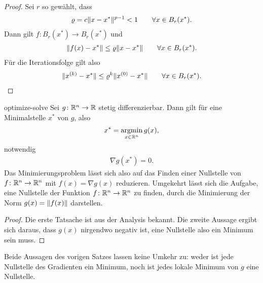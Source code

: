 \begin{proof}
  Sei $r$ so gewählt, dass
  \begin{gather}
    \varrho = c \lVert x-x^*\rVert^{p-1} < 1 \qquad\forall x\in B_r(x^*).
  \end{gather}
  Dann gilt $f\colon  B_r(x^*) \to  B_r(x^*)$ und
  \begin{gather}
    \lVert f(x)-x^*\rVert \le \varrho \lVert x-x^*\rVert \qquad\forall x\in B_r(x^*).
  \end{gather}
  Für die Iterationsfolge gilt also
  \begin{gather}
    \lVert x^{(k)}-x^*\rVert
    \le \varrho^k \lVert x^{(0)}-x^*\rVert
    \qquad\forall x\in B_r(x^*).
  \end{gather} 
\end{proof}

\begin{Satz}{optimize-solve}
  Sei $g\colon \mathbb R^n\to \mathbb R$ stetig differenzierbar. Dann gilt für eine
  Minimalstelle $x^*$ von $g$, also
  \begin{gather}
    x^* = \operatorname*{argmin}_{x\in\mathbb R^n} g(x),
  \end{gather}
  notwendig
  \begin{gather}
    \nabla g(x^*) = 0.
  \end{gather}
  Das Minimierungsproblem lässt sich also auf das Finden einer
  Nullstelle von $f\colon \mathbb R^n\to \mathbb R^n$ mit $f(x) = \nabla g(x)$
  reduzieren. Umgekehrt lässt sich die Aufgabe, eine Nullstelle der
  Funktion $f\colon \mathbb R^n \to \mathbb R^n$ zu finden, durch die Minimierung
  der Norm $g(x) = \lVert f(x)\rVert$ darstellen.
\end{Satz}

\begin{proof}
  Die erste Tatsache ist aus der Analysis bekannt. Die zweite Aussage
  ergibt sich daraus, dass $g(x)$ nirgendwo negativ ist, eine
  Nullstelle also ein Minimum sein muss.
\end{proof}

\begin{remark}
  Beide Aussagen des vorigen Satzes lassen keine Umkehr zu: weder ist
  jede Nullstelle des Gradienten ein Minimum, noch ist jedes lokale
  Minimum von $g$ eine Nullstelle.
\end{remark}

